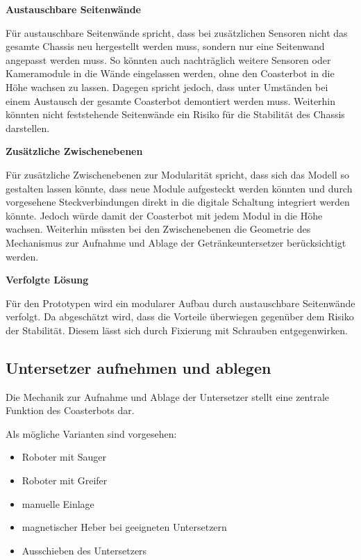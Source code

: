 \documentclass[
  a4paper,
  12pt,
  DIV=12,        %
  parskip=half,  %
  headings=small %
]{scrartcl}
\theoremstyle{definition}
\providecommand{\tightlist}{%
  \setlength{\itemsep}{0pt}\setlength{\parskip}{0pt}}
\theoremstyle{definition}
\begin{document}
\textbf{Austauschbare Seitenwände}

Für austauschbare Seitenwände spricht, dass bei zusätzlichen Sensoren
nicht das gesamte Chassis neu hergestellt werden muss, sondern nur
eine Seitenwand angepasst werden muss. So könnten auch nachträglich
weitere Sensoren oder Kameramodule in die Wände eingelassen werden, ohne
den Coasterbot in die Höhe wachsen zu lassen. Dagegen spricht jedoch, dass
unter Umständen bei einem Austausch der gesamte Coasterbot demontiert werden muss.
Weiterhin könnten nicht feststehende Seitenwände ein Risiko für die Stabilität
des Chassis darstellen.

\textbf{Zusätzliche Zwischenebenen}

Für zusätzliche Zwischenebenen zur Modularität spricht, dass sich das Modell so
gestalten lassen könnte, dass neue Module aufgesteckt werden könnten und durch 
vorgesehene Steckverbindungen direkt in die digitale Schaltung integriert werden könnte.
Jedoch würde damit der Coasterbot mit jedem Modul in die Höhe wachsen. Weiterhin müssten bei
den Zwischenebenen die Geometrie des Mechanismus zur Aufnahme und Ablage der Getränkeuntersetzer
berücksichtigt werden.


\textbf{Verfolgte Lösung}\nopagebreak[4]

Für den Prototypen wird ein modularer Aufbau durch austauschbare Seitenwände verfolgt. Da abgeschätzt wird,
dass die Vorteile überwiegen gegenüber dem Risiko der Stabilität. Diesem lässt sich durch Fixierung mit
Schrauben entgegenwirken.


\subsection{Untersetzer aufnehmen und
ablegen}\label{untersetzer-aufnehmen-und-ablegen}

Die Mechanik zur Aufnahme und Ablage der Untersetzer stellt eine
zentrale Funktion des Coasterbots dar.

Als mögliche Varianten sind vorgesehen:

\begin{itemize}
\tightlist
\item
  Roboter mit Sauger
\item
  Roboter mit Greifer
\item
  manuelle Einlage
\item
  magnetischer Heber bei geeigneten Untersetzern
\item
  Ausschieben des Untersetzers
\end{itemize}
\end{document}
